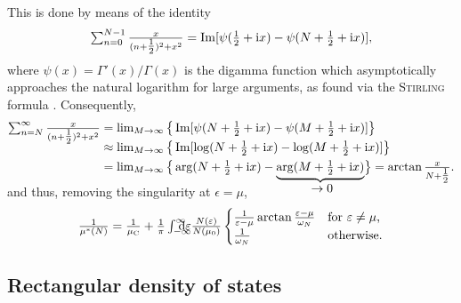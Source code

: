 This is done by means of the identity \cite[Eq.~A.14]{AllenMitrovic82}
%
\begin{equation*}
    \sum_{n = 0}^{N - 1} \frac x {(n + \tfrac 1 2)^2 + x^2}
    = \Im[\psi(\tfrac 1 2 + \I x) - \psi(N + \tfrac 1 2 + \I x)],
\end{equation*}
%
where $\psi(x) = \varGamma'(x) / \varGamma(x)$ is the digamma function which
asymptotically approaches the natural logarithm for large arguments, as found
via the \textsc{Stirling} formula \cite[Appendix~A]{AllenMitrovic82}.
Consequently,
%
\begin{align*}
    \smash[b]{\sum_{n = N}^\infty \frac x {(n + \tfrac 1 2)^2 + x^2}}
    &= \lim_{M \rightarrow \infty}
    \big\{
        \Im[\psi(N + \tfrac 1 2 + \I x) - \psi(M + \tfrac 1 2 + \I x)]
    \big\}
    \\
    &\approx \lim_{M \rightarrow \infty}
    \big\{
        \Im[\log(N + \tfrac 1 2 + \I x) - \log(M + \tfrac 1 2 + \I x)]
    \big\}
    \\
    &= \lim_{M \rightarrow \infty}
    \big\{
        \arg(N + \tfrac 1 2 + \I x) - \smash[b]
        {\hypo{\arg(M + \tfrac 1 2 + \I x)}{\rightarrow 0}}
    \big\}
    = \smash{\arctan \frac x {N + \tfrac 1 2}}.
\end{align*}
%
and thus, removing the singularity at $\epsilon = \mu$,
%
\begin{equation*}
    \frac 1 {\mu^*(N)} = \frac 1 {\mu \sub C}
    + \frac 1 \pi \int \from{-\infty} \till \infty \D \epsilon
    \frac{N(\epsilon)}{N(\mu_0)}
    \begin{cases}
        \frac 1 {\epsilon - \mu} \arctan \frac{\epsilon - \mu}{\omega_N}
            & \text{for $\epsilon \neq \mu$,} \\
        \frac 1 {\omega_N}
            & \text{otherwise.}
    \end{cases}
\end{equation*}

\subsection{Rectangular density of states}
\label{rectangular density of states}

